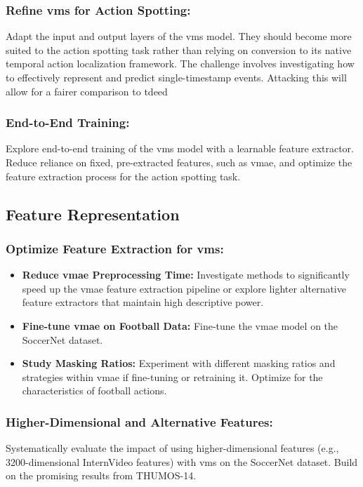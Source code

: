 \subsubsection{Refine \acrshort{vms} for Action Spotting:} 
Adapt the input and output layers of the \acrshort{vms} model. They should become more suited to the action spotting task rather than relying on conversion to its native temporal action localization framework. The challenge involves investigating how to effectively represent and predict single-timestamp events. Attacking this will allow for a fairer comparison to \acrshort{tdeed}

\subsubsection{End-to-End Training:} 
Explore end-to-end training of the \acrshort{vms} model with a learnable feature extractor. Reduce reliance on fixed, pre-extracted features, such as \acrshort{vmae}, and optimize the feature extraction process for the action spotting task.


\subsection{Feature Representation}

\subsubsection{Optimize Feature Extraction for \acrshort{vms}:}
    \begin{itemize}
        \item \textbf{Reduce \acrshort{vmae} Preprocessing Time:} Investigate methods to significantly speed up the \acrshort{vmae} feature extraction pipeline or explore lighter alternative feature extractors that maintain high descriptive power.
        \item \textbf{Fine-tune \acrshort{vmae} on Football Data:} Fine-tune the \acrshort{vmae} model on the SoccerNet dataset.
        \item \textbf{Study Masking Ratios:} Experiment with different masking ratios and strategies within \acrshort{vmae} if fine-tuning or retraining it. Optimize for the characteristics of football actions.
    \end{itemize}
    
\subsubsection{Higher-Dimensional and Alternative Features:} 
Systematically evaluate the impact of using higher-dimensional features (e.g., 3200-dimensional InternVideo features) with \acrshort{vms} on the SoccerNet dataset. Build on the promising results from THUMOS-14.

